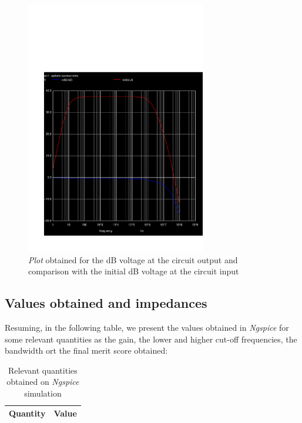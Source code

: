 \vspace{-70px}
\begin{figure}[H]
    \centering
    \vspace{-50px}
    \includegraphics[width = 0.7\textwidth]{sim/vdbout.pdf}
    \vspace{-30px}
    \caption{\textit{Plot} obtained for the dB voltage at the circuit output and comparison with the initial dB voltage at the circuit input}
    \label{fig:output}
\end{figure}

\subsection{Values obtained and impedances}
Resuming, in the following table, we present the values obtained in \textit{Ngspice} for some relevant quantities as the gain, the lower and higher cut-off frequencies, the bandwidth ort the final merit score obtained:

\begin{table}[H]
    \centering
    \begin{tabular}{c|c}
        \textbf{Quantity} & \textbf{Value}\\
        \hline
        \hline
        
    \end{tabular}
    \caption{Relevant quantities obtained on \textit{Ngspice} simulation}
    \label{tab:quantities}
\end{table}

